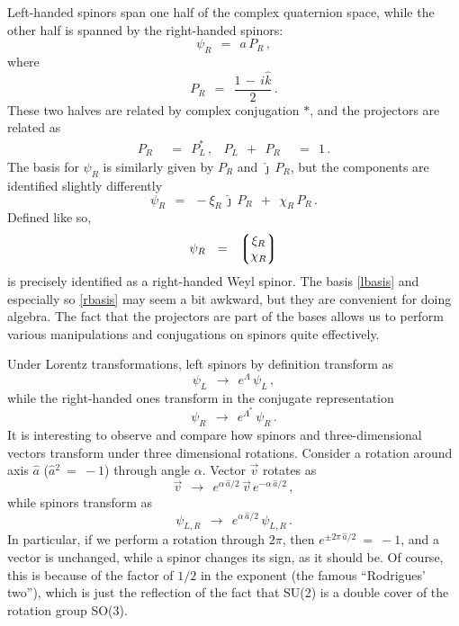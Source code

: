 \documentclass[epsfig,12pt]{article}
\newcommand{\jj}{\hat\jmath}
\newcommand{\kk}{\hat k}
\begin{document}
	Left-handed spinors span one half of the complex quaternion space, while the other half
	is spanned by the right-handed spinors:
\begin{equation}
	\psi_R	~~=~~	a\,P_R\,,
\end{equation}
	where
\begin{equation}
	P_R	~~=~~	\frac{1 \,-\, i\kk} 2\,.
\end{equation}
	These two halves are related by complex conjugation $ * $,
	and the projectors are related as
\begin{align}
	P_R	& ~~=~~	P_L^*\,,
	&
	P_L  ~~+~~  P_R	& ~~=~~ 1\,.
\end{align}
	The basis for $ \psi_R $ is similarly given by $ P_R $ and $ \jj\,P_R $, but the
	components are identified slightly differently
\begin{equation}
\label{rbasis}
	\psi_R	~~=~~	-\xi_R\,\jj\,P_R  ~~+~~  \chi_R\,P_R\,.
\end{equation}
	Defined like so,
\begin{equation}
	\psi_R	~~=~~	\left\lgroup
				\begin{matrix}
					\xi_R \\
					\chi_R
                		\end{matrix}
			\right\rgroup
\end{equation}
	is precisely identified as a right-handed Weyl spinor.
	The basis \eqref{lbasis} and especially so \eqref{rbasis} may seem a bit awkward,
	but they are convenient for doing algebra.
	The fact that the projectors are part of the bases allows us to perform
	various manipulations and conjugations on spinors quite effectively.

	Under Lorentz transformations, left spinors by definition transform as
\begin{equation}
	\psi_L	~~\to~~		e^\Lambda\, \psi_L\,,
\end{equation}
	while the right-handed ones transform in the conjugate representation
\begin{equation}
	\psi_R	~~\to~~		e^{\Lambda^*}\, \psi_R\,.
\end{equation}
	It is interesting to observe and compare how spinors and three-dimensional vectors
	transform under three dimensional rotations.
	Consider a rotation around axis $ \hat a $ ($ \hat a{}^2 ~=~ -1 $) through angle $ \alpha $.
	Vector $ \vec v $ rotates as
\begin{equation}
	\vec v	~~\to~~		e^{\alpha\, \hat a/2}\, \vec v\, e^{-\alpha\, \hat a/2}\,,
\end{equation}
	while spinors transform as
\begin{equation}
	\psi_{L,R}	~~\to~~	e^{\alpha\, \hat a/2}\, \psi_{L,R}\,.
\end{equation}
	In particular, if we perform a rotation through $ 2\pi $, then
	$ e^{\pm 2\pi\,\hat a/2} ~=~ -1 $, and a vector is unchanged,
	while a spinor changes its sign, as it should be.
	Of course, this is because of the factor of $ 1/2 $ in the exponent (the famous ``Rodrigues' two''), which
	is just the reflection of the fact that SU(2) is a double cover of
	the rotation group SO(3).
\end{document}
